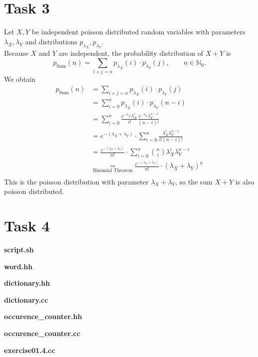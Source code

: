 \documentclass[%
   11pt,              %
   ngerman,           %
   a4paper,           %
   DIV11,             %
]{scrartcl}%
\begin{document}
\section*{Task 3}
Let $X, Y$ be independent poisson distributed random variables with parameters $\lambda_X, \lambda_Y$ and distributions $p_{\lambda_X}, p_{\lambda_Y}$. \\
Because $X$ and $Y$ are independent, the probability distribution of $X+Y$ is
\begin{equation*}
	p_\text{Sum}(n) = \sum_{i+j=n} p_{\lambda_X}(i) \cdot p_{\lambda_Y}(j), \qquad n \in \mathbb{N}_0.
\end{equation*} 
We obtain
\begin{align*}
	p_\text{Sum}(n) &= \sum_{i+j=n} p_{\lambda_X}(i) \cdot p_{\lambda_Y}(j) \\
	&= \sum_{i=0}^n p_{\lambda_X}(i) \cdot p_{\lambda_Y}(n-i) \\
	&= \sum_{i=0}^n \frac{e^{-\lambda_X}\lambda_X^i}{i!} \frac{e^{-\lambda_Y}\lambda_Y^{n-i}}{(n-i)!} \\
	&= e^{-(\lambda_X + \lambda_Y)} \cdot \sum_{i=0}^n  \frac{\lambda_X^i\lambda_Y^{n-i}}{i!(n-i)!} \\
	&= \frac{e^{-(\lambda_X + \lambda_Y)}}{n!} \cdot \sum_{i=0}^n  {n \choose i} \lambda_X^i\lambda_Y^{n-i} \\
	&\underset{\text{Binomial Theorem}}{=} \frac{e^{-(\lambda_X + \lambda_Y)}}{n!} \cdot (\lambda_X + \lambda_Y)^n \\
\end{align*}
This is the poisson distribution with parameter $\lambda_X + \lambda_Y$, so the sum $X + Y$ is also poisson distributed.
\newpage \section*{Task 4}
	\textbf{script.sh}
	
	\textbf{word.hh}
	
	\textbf{dictionary.hh}
	
	\textbf{dictionary.cc}
    
	\textbf{occurence\_counter.hh}
	
	\textbf{occurence\_counter.cc}
	
	\textbf{exercise01.4.cc}
	
\end{document}
